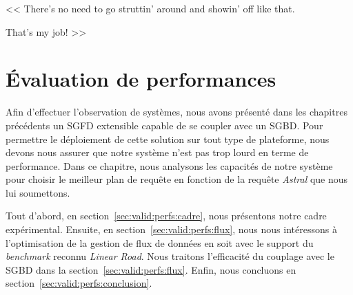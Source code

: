 \begin{savequote}[6cm]
<< There's no need to go struttin' around and showin' off like that. 

\quad That's my job! >>
\end{savequote}

\chapter{Évaluation de performances}\label{chap:valid:perfs}
\chaptertoc

Afin d'effectuer l'observation de systèmes, nous avons présenté dans les chapitres précédents un SGFD extensible capable de se coupler avec un SGBD. Pour permettre le déploiement de cette solution sur tout type de plateforme, nous devons nous assurer que notre système n'est pas trop lourd en terme de performance. Dans ce chapitre, nous analysons les capacités de notre système pour choisir le meilleur plan de requête en fonction de la requête \textit{Astral} que nous lui soumettons.

Tout d'abord, en section~\ref{sec:valid:perfs:cadre}, nous présentons notre cadre expérimental. Ensuite, en section~\ref{sec:valid:perfs:flux}, nous nous intéressons à l'optimisation de la gestion de flux de données en soit avec le support du \textit{benchmark} reconnu \textit{Linear Road}. Nous traitons l'efficacité du couplage avec le SGBD dans la section~\ref{sec:valid:perfs:flux}. Enfin, nous concluons en section~\ref{sec:valid:perfs:conclusion}.





